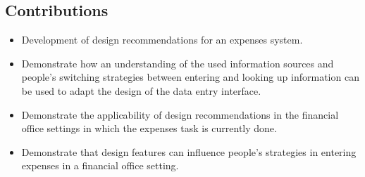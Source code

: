 \subsection{Contributions}
\begin{itemize}
\item
Development of design recommendations for an expenses system.
\item
Demonstrate how an understanding of the used information sources and people's switching strategies between entering and looking up information can be used to adapt the design of the data entry interface. 
\item
Demonstrate the applicability of design recommendations in the financial office settings in which the expenses task is currently done. 
\item
Demonstrate that design features can influence people's strategies in entering expenses in a financial office setting.
\end{itemize}

